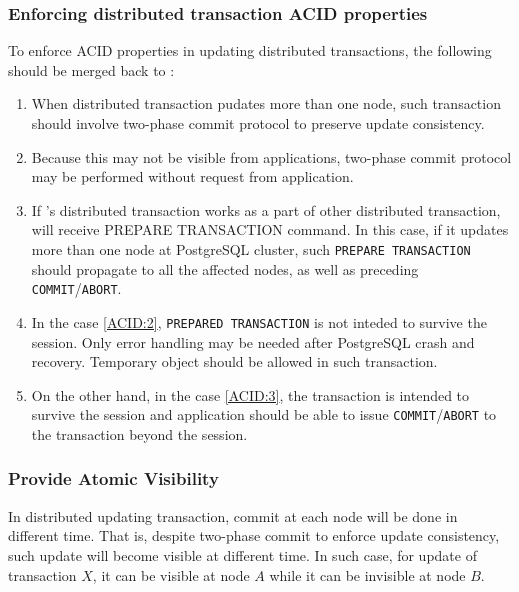 \subsubsection{\label{plan:implicit}Enforcing distributed transaction ACID properties}

	To enforce ACID properties in updating distributed transactions,
	the following should be merged back to \PG:

	\begin{enumerate}
		\item When distributed transaction pudates more than one node, such transaction
			  should involve two-phase commit protocol to preserve update consistency.
		\item \label{ACID:2}Because this may not be visible from applications, two-phase
			  commit protocol may be performed without request from application.
		\item \label{ACID:3}If \PG's distributed transaction works as a part of other distributed
			  transaction, \PG{} will receive PREPARE TRANSACTION command.
			  In this case, if it updates more than one node at PostgreSQL cluster,
			  such \texttt{PREPARE TRANSACTION} should propagate to all the affected nodes,
			  as well as preceding \texttt{COMMIT}/\texttt{ABORT}.
		\item In the case \ref{ACID:2}, \texttt{PREPARED TRANSACTION} is not inteded to
			  survive the session.
			  Only error handling may be needed after PostgreSQL crash and recovery.
			  Temporary object should be allowed in such transaction.
		\item On the other hand, in the case \ref{ACID:3}, the transaction is intended
			  to survive the session and application should be able to issue
			  \texttt{COMMIT}/\texttt{ABORT} to the transaction beyond the session.
	\end{enumerate}



\subsubsection{\label{plan:atomicV}Provide Atomic Visibility}

	In distributed updating transaction, commit at each node will be done in different time.
	That is, despite two-phase commit to enforce update consistency, such update will become
	visible at different time.
	In such case, for update of transaction $X$, it can be visible at node $A$ while it can
	be invisible at node $B$.

